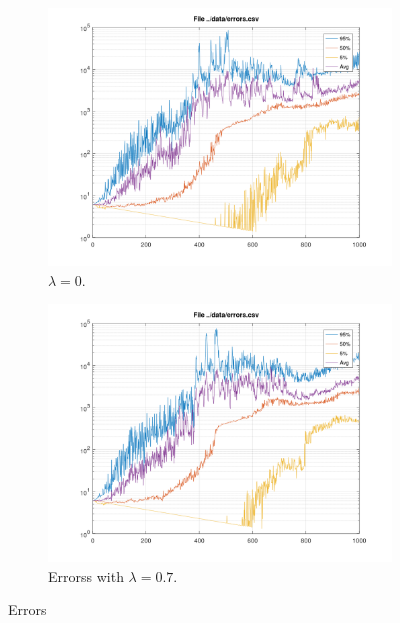 \documentclass[a4paper,11pt]{article}
\begin{document}
\begin{figure}[h!]
	\centering
	\begin{subfigure}[b]{0.4\linewidth}
		\includegraphics[width=\linewidth]{errors-0.png}
		\caption{$\lambda=0$.}
	\end{subfigure}
	\begin{subfigure}[b]{0.4\linewidth}
		\includegraphics[width=\linewidth]{errors-07.png}
		\caption{Errorss with $\lambda=0.7$.}
	\end{subfigure}
	\caption{Errors}
	\label{fig:errors}
\end{figure}
\end{document}

